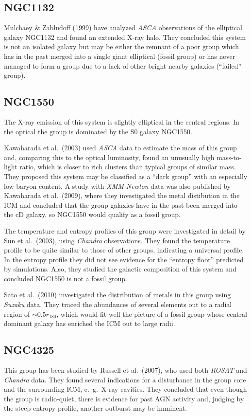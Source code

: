 \documentclass[structabstract]{aa}
\begin{document}
 \subsection*{NGC1132}
Mulchaey \& Zabludoff (1999) have analyzed \emph{ASCA} observations of the
elliptical galaxy NGC1132 and found an extended X-ray halo. They concluded
this system is not an isolated galaxy but may be either the remnant of a
poor group which has in the past merged into a single giant elliptical (fossil
group) or has never managed to form a group due to a lack of other bright
nearby galaxies (``failed'' group).
 \subsection*{NGC1550}
The X-ray emission of this system is slightly elliptical in the central
regions. In the optical the group is dominated by the S0 galaxy NGC1550.

Kawaharada et al.\ (2003) used \emph{ASCA} data to estimate the mass of this
group and, comparing this to the optical luminosity, found an unusually high
mass-to-light ratio, which is closer to rich clusters than typical groups of
similar mass. They proposed this system may be classified as a ``dark group''
with an especially low baryon content. A study with \emph{XMM-Newton} data was
also published by Kawaharada et al.\ (2009), where they investigated the metal
distibution in the ICM and concluded that the group galaxies have in the past
been merged into the cD galaxy, so NGC1550 would qualify as a fossil group.

The temperature and entropy profiles of this group were investigated in detail
by Sun et al.\ (2003), using \emph{Chandra} observations. They found the
temperature profile to be quite similar to those of other groups, indicating a
universal profile. In the entropy profile they did not see evidence for the
``entropy floor'' predicted by simulations. Also, they studied the galactic
composition of this system and concluded NGC1550 is not a fossil group.

Sato et al.\ (2010) investigated the distribution of metals in this group
using \emph{Suzaku} data. They traced the abundances of several elements out
to a radial region of $\sim 0.5 r_{180}$, which would fit well the picture
of a fossil group whose central dominant galaxy has enriched the ICM out to large
radii.
 \subsection*{NGC4325}
This group has been studied by Russell et al.\ (2007), who used both \emph{ROSAT}
and \emph{Chandra} data. They found several indications for a disturbance in
the group core and the surrounding ICM, e.\ g.\ X-ray cavities. They concluded
that even though the group is radio-quiet, there is evidence for past AGN
activity and, judging by the steep entropy profile, another outburst may
be imminent.
\end{document}
